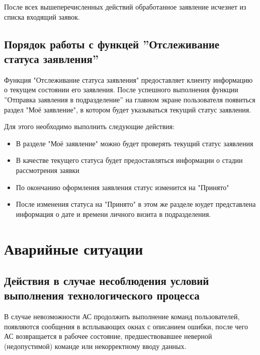\documentclass[russian, utf8, 12pt,pointsubsection,floatsubsection]{eskdtext}
\begin{document}
После всех вышеперечисленных действий обработанное заявление исчезнет из списка входящий заявок.

\subsection{Порядок работы с функцей ''Отслеживание статуса заявления''}
Функция "Отслеживание статуса заявления" предоставляет клиенту информацию о текущем состоянии его заявления. После успешного выполнения функции ''Отправка заявления в подразделение'' на главном экране пользователя появиться раздел "Моё заявление", в котором будет указываться текущий статус заявления.

Для этого необходимо выполнить следующие действия:
\begin{itemize}
    \item В разделе "Моё заявление" можно будет проверять текущий статус заявления
    \item В качестве текущего статуса будет предоставляться информации о стадии рассмотрения заявки
    \item По окончанию оформления заявления статус изменится на "Принято"
    \item После изменения статуса на "Принято" в этом же разделе юудет представлена информация о дате и времени личного визита в подразделения.
\end{itemize}




\section{Аварийные ситуации}


\subsection{Действия в случае несоблюдения условий выполнения технологического процесса}
В случае невозможности АС продолжить выполнение команд пользователей, появляются сообщения в всплывающих окнах с описанием ошибки, после чего АС возвращается в рабочее состояние, предшествовавшее неверной (недопустимой) команде или некорректному вводу данных.
\end{document}
